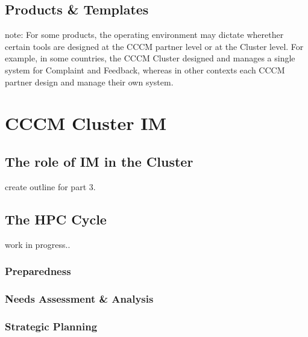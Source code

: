 \documentclass[letterpaper,10pt,english]{jupyterBook}
\begin{document}
\chapter{Products \& Templates}
\label{\detokenize{part2/products:products-templates}}\label{\detokenize{part2/products::doc}}
\sphinxAtStartPar
note: For some products, the operating environment may dictate wherether certain tools are designed at the CCCM partner level or at the Cluster level. For example, in some countries, the CCCM Cluster designed and manages a single system for Complaint and Feedback, whereas in other contexts each CCCM partner design and manage their own system.


\part{CCCM Cluster IM}


\chapter{The role of IM in the Cluster}
\label{\detokenize{part3/cluster:the-role-of-im-in-the-cluster}}\label{\detokenize{part3/cluster::doc}}
\sphinxAtStartPar
{} create outline for part 3.


\chapter{The HPC Cycle}
\label{\detokenize{part3/hpccycle:the-hpc-cycle}}\label{\detokenize{part3/hpccycle::doc}}
\sphinxAtStartPar
work in progress..


\section{Preparedness}
\label{\detokenize{part3/preparedness:preparedness}}\label{\detokenize{part3/preparedness::doc}}

\section{Needs Assessment \& Analysis}
\label{\detokenize{part3/needs assessment:needs-assessment-analysis}}\label{\detokenize{part3/needs assessment::doc}}

\section{Strategic Planning}
\label{\detokenize{part3/strategic planning:strategic-planning}}\label{\detokenize{part3/strategic planning::doc}}
\end{document}
